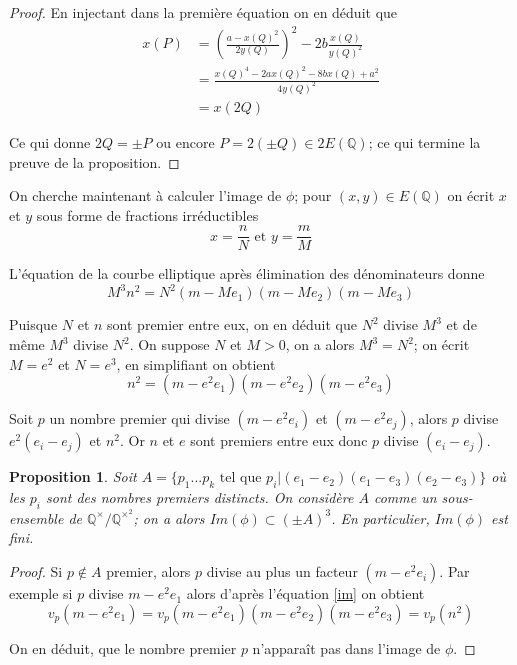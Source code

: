 \documentclass{article}
\newtheorem{proposition}{Proposition}
\begin{document}
\begin{proof}
En injectant dans la première équation on en déduit que
\begin{align*}
x(P)	&= {(\frac{a - x(Q)^2}{2y(Q)})}^2 - 2b\frac{x(Q)}{y(Q)^2} \\
		&= \frac{x(Q)^4 - 2ax(Q)^2 - 8bx(Q) + a^2}{4y(Q)^2} \\
		&= x(2Q)
\end{align*}

Ce qui donne $2Q = \pm P$ ou encore $P = 2(\pm Q) \in 2E(\mathbb{Q})$; ce qui termine la preuve de la proposition.
\end{proof}

On cherche maintenant à calculer l'image de $\phi$; pour $(x, y) \in E(\mathbb{Q})$ on écrit $x$ et $y$ sous forme
de fractions irréductibles
\begin{equation*}
x=\frac{n}{N} \text{ et } y=\frac{m}{M}
\end{equation*}

L'équation de la courbe elliptique après élimination des dénominateurs donne
\begin{equation*}
M^3n^2 = N^2(m-Me_{1})(m-Me_{2})(m-Me_{3})
\end{equation*}

Puisque $N$ et $n$ sont premier entre eux, on en déduit que $N^2$ divise $M^3$ et de même $M^3$ divise $N^2$.
On suppose $N$ et $M > 0$, on a alors $M^3 = N^2$; on écrit $M=e^2$ et $N=e^3$, en simplifiant on obtient
\begin{equation}
\label{im}
n^2 = (m-e^2e_{1})(m-e^2e_{2})(m-e^2e_{3})
\end{equation}

Soit $p$ un nombre premier qui divise $(m-e^2e_{i})$ et $(m-e^2e_{j})$, alors $p$ divise $e^2(e_{i}-e_{j})$ et $n^2$.
Or $n$ et $e$ sont premiers entre eux donc $p$ divise $(e_{i}-e_{j})$.
\begin{proposition}
Soit $A=\{p_{1}...p_{k} \text{ tel que } p_{i} | (e_{1}-e_{2})(e_{1}-e_{3})(e_{2}-e_{3})\}$ où les $p_i$ sont des nombres premiers distincts. On considère $A$ comme un sous-ensemble de $\mathbb{Q}^{\times}/\mathbb{Q}^{\times^2}$; on a alors $Im(\phi) \subset (\pm A)^3$. En particulier,
$Im(\phi)$ est fini.
\end{proposition}

\begin{proof}
Si $p \not\in A$ premier, alors $p$ divise au plus un facteur $(m-e^2e_{i})$. Par exemple si $p$ divise $m-e^2e_{1}$
alors d'après l'équation \ref{im} on obtient
\begin{equation*}
v_{p}(m-e^2e_{1})=v_{p}(m-e^2e_{1})(m-e^2e_{2})(m-e^2e_{3})=v_{p}(n^2)
\end{equation*}

On en déduit, que le nombre premier $p$ n'apparaît pas dans l'image de $\phi$.
\end{proof}
\end{document}
